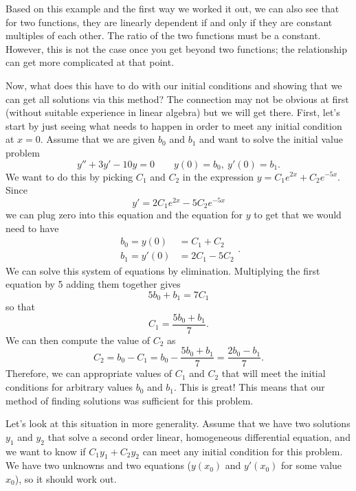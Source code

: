 Based on this example and the first way we worked it out, we can also see that for two functions, they are linearly dependent if and only if they are constant multiples of each other. The ratio of the two functions must be a constant. However, this is not the case once you get beyond two functions; the relationship can get more complicated at that point.

Now, what does this have to do with our initial conditions and showing that we can get all solutions via this method? The connection may not be obvious at first (without suitable experience in linear algebra) but we will get there. First, let's start by just seeing what needs to happen in order to meet any initial condition at $x=0$. Assume that we are given $b_0$ and $b_1$ and want to solve the initial value problem
\begin{equation*}
y'' + 3y' - 10y = 0 \qquad y(0) = b_0,\ y'(0) = b_1.
\end{equation*}
We want to do this by picking $C_1$ and $C_2$ in the expression $y=C_1e^{2x} + C_2e^{-5x}$. Since 
\begin{equation*}
y' = 2C_1e^{2x} - 5C_2e^{-5x}
\end{equation*}
we can plug zero into this equation and the equation for $y$ to get that we would need to have
\begin{equation*}
\begin{split}
b_0 = y(0) &= C_1 + C_2 \\
b_1 = y'(0) &= 2C_1 - 5C_2
\end{split}.
\end{equation*}
We can solve this system of equations by elimination. Multiplying the first equation by 5 adding them together gives
\begin{equation*}
5b_0 + b_1 = 7C_1
\end{equation*}
so that
\begin{equation*}
C_1 = \frac{5b_0 + b_1}{7}.
\end{equation*}
We can then compute the value of $C_2$ as 
\begin{equation*}
C_2 = b_0 - C_1 = b_0 - \frac{5b_0 + b_1}{7} = \frac{2b_0 - b_1}{7}.
\end{equation*}
Therefore, we can appropriate values of $C_1$ and $C_2$ that will meet the initial conditions for arbitrary values $b_0$ and $b_1$. This is great! This means that our method of finding solutions was sufficient for this problem. 

Let's look at this situation in more generality. Assume that we have two solutions $y_1$ and $y_2$ that solve a second order linear, homogeneous differential equation, and we want to know if $C_1y_1 + C_2y_2$ can meet any initial condition for this problem. We have two unknowns and two equations ($y(x_0)$ and $y'(x_0)$ for some value $x_0$), so it should work out. 

